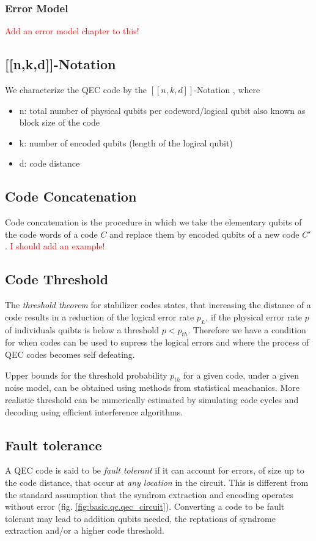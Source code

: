 \subsubsection{Error Model}
\textcolor{red}{Add an error model chapter to this!}


\subsection{[[n,k,d]]-Notation}\label{sssec:nkd_notation}
We characterize the QEC code by the $[[n,k,d]]$-Notation \cite{QECintro}, where 
\begin{itemize}
    \item n: total number of physical qubits per codeword/logical qubit 
    \subitem also known as block size of the code \cite{QECmemory}
    \item k: number of encoded qubits (length of the logical qubit)
    \item d: code distance
\end{itemize}


\subsection{Code Concatenation}
Code concatenation is the procedure in which we take the elementary qubits of the code words of a code $C$ 
and replace them by encoded qubits of a new code $C'$. \cite{QECmemory}
\textcolor{red}{I should add an example!}


\subsection{Code Threshold}
The \textit{threshold theorem} for stabilizer codes states,
that increasing the distance of a code results in a reduction of the logical error rate $p_L$,
if the physical error rate $p$ of individuals quibts is below a threshold $p<p_{th}$.
Therefore we have a condition for when codes can be used to supress the logical errors 
and where the process of QEC codes becomes self defeating. \cite{QECintro}

Upper bounds for the threshold probability $p_{th}$ for a given code, under a given noise model, 
can be obtained using methods from statistical meachanics.
More realistic threshold can be numerically estimated by simulating code cycles 
and decoding using efficient interference algorithms. \cite{QECintro}


\subsection{Fault tolerance}
A QEC code is said to be \textit{fault tolerant} 
if it can account for errors, of size up to the code distance, 
that occur at \textit{any location} in the circuit.
This is different from the standard assumption that the syndrom extraction and encoding operates without error
(fig. \ref{fig:basic.qc.qec_circuit}).
Converting a code to be fault tolerant may lead to addition qubits needed, 
the reptations of syndrome extraction and/or a higher code threshold. \cite{QECintro}


